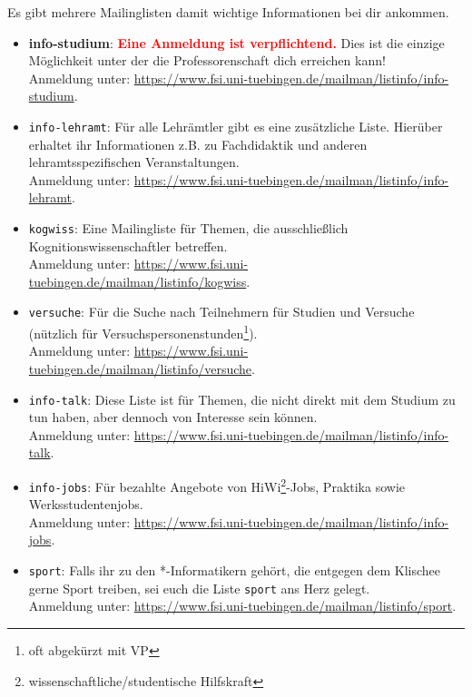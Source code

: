 Es gibt mehrere Mailinglisten damit wichtige Informationen bei dir ankommen. 
\begin{itemize}
\item \textbf{info-studium}: \textcolor{red}{\textbf{Eine Anmeldung ist verpflichtend.}} Dies ist die einzige Möglichkeit unter der die Professorenschaft dich erreichen kann! \\
Anmeldung unter: \url{https://www.fsi.uni-tuebingen.de/mailman/listinfo/info-studium}.
\iflehramt
\item \texttt{info-lehramt}: Für alle Lehrämtler gibt es eine zusätzliche Liste. Hierüber erhaltet ihr Informationen z.B. zu Fachdidaktik und anderen lehramtsspezifischen Veranstaltungen.\\
Anmeldung unter: \url{https://www.fsi.uni-tuebingen.de/mailman/listinfo/info-lehramt}.
\fi
\ifkogwiss 
\item \texttt{kogwiss}: Eine Mailingliste für Themen, die ausschließlich Kognitionswissenschaftler betreffen. \\
Anmeldung unter: \url{https://www.fsi.uni-tuebingen.de/mailman/listinfo/kogwiss}.

\item \texttt{versuche}: Für die Suche nach Teilnehmern für Studien und Versuche (nützlich für Versuchspersonenstunden\footnote{oft abgekürzt mit VP}).\\
Anmeldung unter: \url{https://www.fsi.uni-tuebingen.de/mailman/listinfo/versuche}. 
\fi
\item \texttt{info-talk}: Diese Liste ist für Themen, die nicht direkt mit dem Studium zu tun haben, aber dennoch von Interesse sein können.\\
Anmeldung unter: \url{https://www.fsi.uni-tuebingen.de/mailman/listinfo/info-talk}.
\item \texttt{info-jobs}: Für bezahlte Angebote von HiWi\footnote{wissenschaftliche/studentische Hilfskraft}-Jobs, Praktika sowie  Werksstudentenjobs.\\
Anmeldung unter: \url{https://www.fsi.uni-tuebingen.de/mailman/listinfo/info-jobs}.
\item \texttt{sport}: Falls ihr zu den *-Informatikern gehört, die entgegen dem Klischee gerne Sport treiben, sei euch die Liste \texttt{sport} ans Herz gelegt.\\
Anmeldung unter: \url{https://www.fsi.uni-tuebingen.de/mailman/listinfo/sport}. 
\end{itemize}
